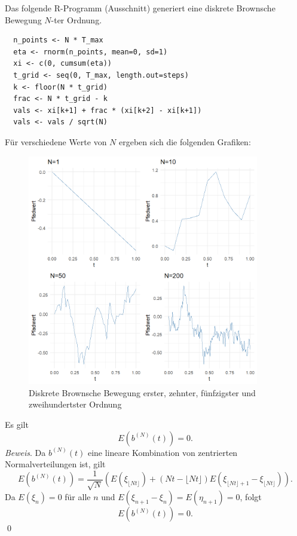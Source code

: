 \begin{bsp}
Das folgende R-Programm (Ausschnitt) generiert eine diskrete Brownsche Bewegung $N$-ter Ordnung.

\begin{lstlisting}
  n_points <- N * T_max
  eta <- rnorm(n_points, mean=0, sd=1)
  xi <- c(0, cumsum(eta))
  t_grid <- seq(0, T_max, length.out=steps)
  k <- floor(N * t_grid)
  frac <- N * t_grid - k
  vals <- xi[k+1] + frac * (xi[k+2] - xi[k+1])
  vals <- vals / sqrt(N)
\end{lstlisting}
Für verschiedene Werte von $N$ ergeben sich die folgenden Grafiken:

\begin{figure}[H]
    \centering
    \includegraphics[width=0.9\textwidth]{images/disrete_bb.png}
    \caption{Diskrete Brownsche Bewegung erster, zehnter, fünfzigster und zweihundertster Ordnung}
    \label{fig:brownian}
\end{figure}

\end{bsp}

\begin{lemma}
Es gilt
$$
E(b^{(N)}(t)) = 0.
$$
\textit{Beweis}.
Da $b^{(N)}(t)$ eine lineare Kombination von zentrierten Normalverteilungen ist, gilt
$$
E(b^{(N)}(t)) = \frac{1}{\sqrt{N}} \left( E(\xi_{\lfloor Nt \rfloor}) + (Nt - \lfloor Nt \rfloor) E(\xi_{\lfloor Nt \rfloor + 1} - \xi_{\lfloor Nt \rfloor}) \right).
$$
Da $E(\xi_n) = 0$ für alle $n$ und $E(\xi_{n+1} - \xi_n) = E(\eta_{n+1}) = 0$, folgt
$$
E(b^{(N)}(t)) = 0.
$$
\qed
\end{lemma}

